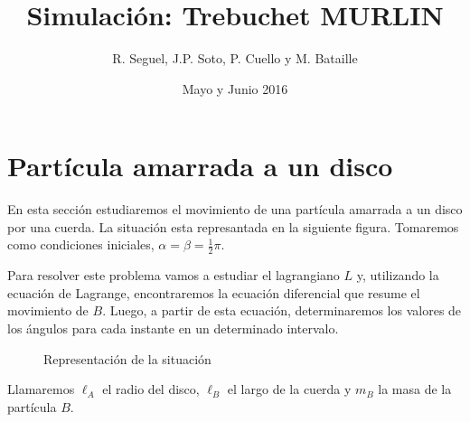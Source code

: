 \documentclass[10pt]{article}
\begin{document}
 
\title{Simulación: Trebuchet MURLIN}
\author{R. Seguel, J.P. Soto, P. Cuello y M. Bataille}
\date{Mayo y Junio 2016}
\maketitle

\section{Partícula amarrada a un disco}

En esta sección estudiaremos el movimiento de una partícula amarrada a un disco por una cuerda. La situación esta represantada
en la siguiente figura. Tomaremos como condiciones iniciales, $\alpha = \beta = \frac12\pi$.

Para resolver este problema vamos a estudiar el lagrangiano $L$ y, utilizando la ecuación de Lagrange, encontraremos la
ecuación diferencial que resume el movimiento de $B$. Luego, a partir de esta ecuación, determinaremos los valores de los ángulos
para cada instante en un determinado intervalo.
\begin{figure}[h]
\centering

\caption{Representación de la situación}
\end{figure}
Llamaremos $\ell_A$ el radio del disco, $\ell_B$ el largo de la cuerda y $m_B$ la masa de la partícula $B$.
\end{document}
